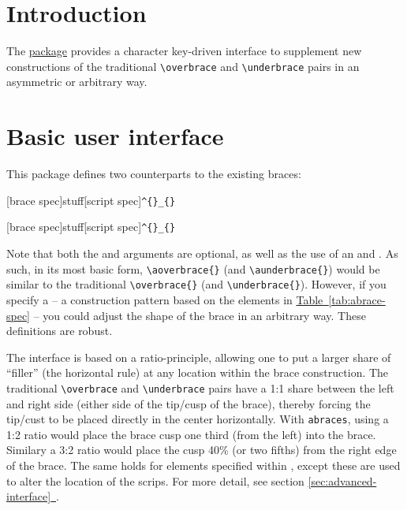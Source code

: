 \documentclass[10pt]{ltxdockit}[2011/03/25]
\begin{document}
\printtitlepage

\section{Introduction} \label{sec:introduction}

The \href{http://ctan.org/pkg/abraces}{ package} provides a character key-driven interface to supplement new constructions of the traditional \lstinline!\overbrace! and \lstinline!\underbrace! pairs in an asymmetric or arbitrary way.

\section{Basic user interface} \label{sec:user-interface}

This package defines two counterparts to the existing braces:

\begin{ltxsyntax}

[brace spec]{stuff}[script spec]\lstinline!^{!\lstinline!}_{!\lstinline!}!

[brace spec]{stuff}[script spec]\lstinline!^{!\lstinline!}_{!\lstinline!}!

\end{ltxsyntax}

Note that both the  and  arguments are optional, as well as the use of an  and . As such, in its most basic form, \lstinline!\aoverbrace{!\lstinline!}! (and \lstinline!\aunderbrace{!\lstinline!}!) would be similar to the traditional \lstinline!\overbrace{!\lstinline!}! (and \lstinline!\underbrace{!\lstinline!}!). However, if you specify a  -- a construction pattern based on the elements in \hyperref[tab:abrace-spec]{Table~\ref*{tab:abrace-spec}} -- you could adjust the shape of the brace in an arbitrary way. These definitions are robust.

The  interface is based on a ratio-principle, allowing one to put a larger share of ``filler'' (the horizontal rule) at any location within the brace construction. The traditional \lstinline!\overbrace! and \lstinline!\underbrace! pairs have a \mbox{1:1} share between the left and right side (either side of the tip/cusp of the brace), thereby forcing the tip/cust to be placed directly in the center horizontally. With \lstinline!abraces!, using a \mbox{1:2} ratio would place the brace cusp one third (from the left) into the brace. Similary a \mbox{3:2} ratio would place the cusp 40\% (or two fifths) from the right edge of the brace. The same holds for elements specified within , except these are used to alter the location of the scrips. For more detail, see section \hyperref[sec:advanced-interface]{\ref*{sec:advanced-interface}~}.
\end{document}
